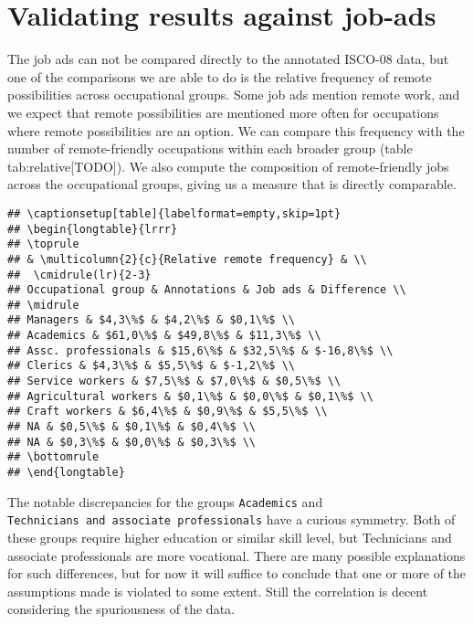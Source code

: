 \documentclass[11pt,]{article}
\begin{document}
\hypertarget{validating-results-against-job-ads}{%
\section{Validating results against
job-ads}\label{validating-results-against-job-ads}}

The job ads can not be compared directly to the annotated ISCO-08 data,
but one of the comparisons we are able to do is the relative frequency
of remote possibilities across occupational groups. Some job ads mention
remote work, and we expect that remote possibilities are mentioned more
often for occupations where remote possibilities are an option. We can
compare this frequency with the number of remote-friendly occupations
within each broader group (table tab:relative{[}TODO{]}). We also
compute the composition of remote-friendly jobs across the occupational
groups, giving us a measure that is directly comparable.

\begin{verbatim}
## \captionsetup[table]{labelformat=empty,skip=1pt}
## \begin{longtable}{lrrr}
## \toprule
## & \multicolumn{2}{c}{Relative remote frequency} & \\ 
##  \cmidrule(lr){2-3}
## Occupational group & Annotations & Job ads & Difference \\ 
## \midrule
## Managers & $4,3\%$ & $4,2\%$ & $0,1\%$ \\ 
## Academics & $61,0\%$ & $49,8\%$ & $11,3\%$ \\ 
## Assc. professionals & $15,6\%$ & $32,5\%$ & $-16,8\%$ \\ 
## Clerics & $4,3\%$ & $5,5\%$ & $-1,2\%$ \\ 
## Service workers & $7,5\%$ & $7,0\%$ & $0,5\%$ \\ 
## Agricultural workers & $0,1\%$ & $0,0\%$ & $0,1\%$ \\ 
## Craft workers & $6,4\%$ & $0,9\%$ & $5,5\%$ \\ 
## NA & $0,5\%$ & $0,1\%$ & $0,4\%$ \\ 
## NA & $0,3\%$ & $0,0\%$ & $0,3\%$ \\ 
## \bottomrule
## \end{longtable}
\end{verbatim}

The notable discrepancies for the groups \texttt{Academics} and
\texttt{Technicians\ and\ associate\ professionals} have a curious
symmetry. Both of these groups require higher education or similar skill
level, but Technicians and associate professionals are more vocational.
There are many possible explanations for such differences, but for now
it will suffice to conclude that one or more of the assumptions made is
violated to some extent. Still the correlation is decent considering the
spuriousness of the data.
\end{document}
